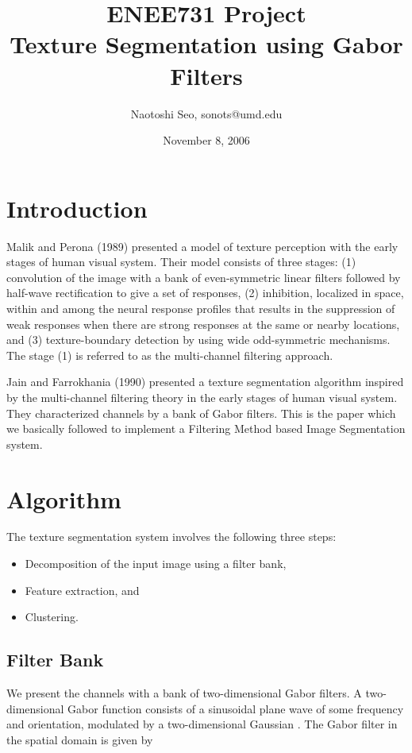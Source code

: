 \documentclass[article,oneside]{memoir}
\title {ENEE731 Project\\Texture Segmentation using Gabor Filters}
\author{Naotoshi Seo, sonots@umd.edu}
\date{November 8, 2006}
\begin{document}
\maketitle

\chapter{Introduction}


Malik and Perona (1989) \cite{Malik} presented a model of texture perception with the early stages of human visual system. Their model consists of three stages: (1) convolution of the image with a bank of even-symmetric linear filters followed by half-wave rectification to give a set of responses, (2) inhibition, localized in space, within and among the neural response profiles that results in the suppression of weak   responses when there are strong responses at the same or nearby locations, and (3) texture-boundary detection by using wide odd-symmetric mechanisms. The stage (1) is referred to as the multi-channel filtering approach. 

Jain and Farrokhania (1990) \cite{Jain} presented a texture segmentation algorithm inspired by the multi-channel filtering theory in  the early stages of human visual system. They characterized channels by a bank of Gabor filters.  This is the paper which we basically followed to implement a Filtering Method based Image Segmentation system. 

\chapter{Algorithm}

The texture segmentation system involves the following three steps:
\begin{itemize}
\item Decomposition of the input image using a filter bank, 
\item Feature extraction, and
\item Clustering. 
\end{itemize}

\section{Filter Bank}


We present the channels with a bank of two-dimensional Gabor filters. 
A two-dimensional Gabor function consists of a sinusoidal plane wave of some frequency and orientation, modulated by a two-dimensional Gaussian \cite{Daugman}. The Gabor filter in the spatial domain is given by
                                                                  
\end{document}
